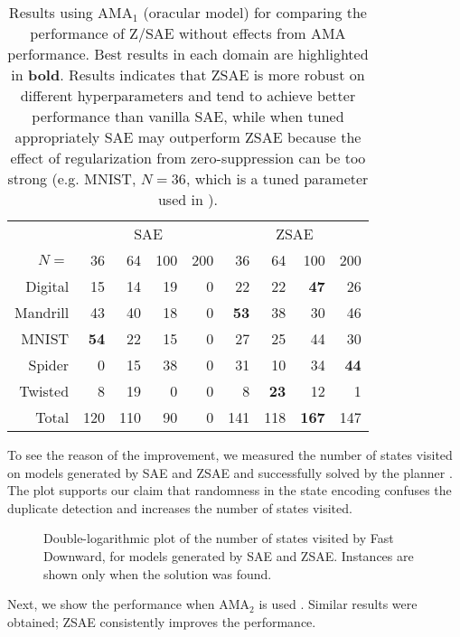 \begin{table}[htbp]
\centering
{}
\begin{tabular}{|r|rrrr|rrrr|}
 & \multicolumn{4}{c|}{SAE} & \multicolumn{4}{c|}{ZSAE} \\ 
$N=$ & {36} & {64} & {100} & {200} & {36} & {64} & {100} & {200} \\ \hline
Digital & 15 & 14 & 19 & 0 & 22 & 22 & \textbf{47} & 26 \\
Mandrill & 43 & 40 & 18 & 0 & \textbf{53} & 38 & 30 & 46 \\
MNIST & \textbf{54} & 22 & 15 & 0 & 27 & 25 & 44 & 30 \\
Spider & 0 & 15 & 38 & 0 & 31 & 10 & 34 & \textbf{44} \\
Twisted & 8 & 19 & 0 & 0 & 8 & \textbf{23} & 12 & 1 \\ \hline
Total & {120} & {110} & {90} & {0} & {141} & {118} & \textbf{167} & {147} \\
\end{tabular}
\caption{Results using AMA$_1$ (oracular model) for comparing the performance of Z/SAE without effects from AMA performance.
Best results in each domain are highlighted in \textbf{bold}.
Results indicates that ZSAE is more robust on different hyperparameters and tend to achieve better performance than vanilla SAE,
while when tuned appropriately SAE may outperform ZSAE because the effect of regularization from zero-suppression can be too strong
(e.g. MNIST, $N=36$, which is a tuned parameter used in \cite{Asai2018}).
}
\label{tab:ama1}
\end{table}

To see the reason of the improvement, we measured the number of states
visited on models generated by SAE and ZSAE and successfully solved by
the planner . The plot supports our claim that
randomness in the state encoding confuses the duplicate detection and
increases the number of states visited.

\begin{figure}[htb]
 \vspace{2in}
 \caption{Double-logarithmic plot of the number of states visited by Fast Downward,
for models generated by SAE and ZSAE. Instances are shown only when the solution was found.}
 \label{fig:ama1-visted}
\end{figure}


Next, we show the performance when AMA$_2$ is used
. Similar results were obtained; ZSAE consistently
improves the performance.

